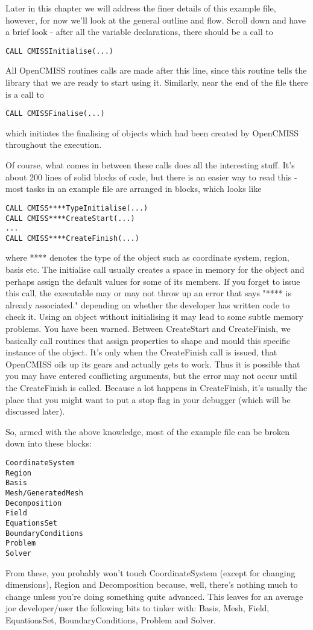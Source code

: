 Later in this chapter we will address the finer details of this example file, however, for
now we'll look at the general outline and flow. Scroll down and have a brief look - after
all the variable declarations, there should be a call to 
\begin{lstlisting}
CALL CMISSInitialise(...)
\end{lstlisting}
All OpenCMISS routines calls are made after this line, since this routine tells the library
that we are ready to start using it. Similarly, near the end of the file there is a call to
\begin{lstlisting}
CALL CMISSFinalise(...)
\end{lstlisting}
which initiates the finalising of objects which had been created by OpenCMISS throughout
the execution.

Of course, what comes in between these calls does all the interesting stuff. It's about 200 
lines of solid blocks of code, but there is an easier way to read this - most tasks in an
example file are arranged in blocks, which looks like
\begin{lstlisting}
CALL CMISS****TypeInitialise(...)
CALL CMISS****CreateStart(...)
...
CALL CMISS****CreateFinish(...)
\end{lstlisting}
where **** denotes the type of the object such as coordinate system, region, basis etc. 
The initialise call usually creates a space in memory for the object and perhaps assign the
default values for some of its members. If you forget to issue this call, the executable may
or may not throw up an error that says "**** is already associated." depending on whether the 
developer has written code to check it. Using an object without initialising it may lead to 
some subtle memory problems. You have been warned.
Between CreateStart and CreateFinish, we basically call routines that assign properties to 
shape and mould this specific instance of the object. It's only when the CreateFinish call 
is issued, that OpenCMISS oils up its gears and actually gets to work. Thus it is possible that
you may have entered conflicting arguments, but the error may not occur until the CreateFinish
is called. Because a lot happens in CreateFinish, it's usually the place that you might want
to put a stop flag in your debugger (which will be discussed later).

So, armed with the above knowledge, most of the example file can be broken down into these 
blocks:
\begin{lstlisting}
CoordinateSystem
Region
Basis
Mesh/GeneratedMesh
Decomposition
Field
EquationsSet
BoundaryConditions
Problem
Solver
\end{lstlisting}
From these, you probably won't touch CoordinateSystem (except for changing dimensions), Region 
and Decomposition because, well, there's nothing much to change unless you're doing something
quite advanced. This leaves for an average joe developer/user the following bits to tinker with:
Basis, Mesh, Field, EquationsSet, BoundaryConditions, Problem and Solver.

